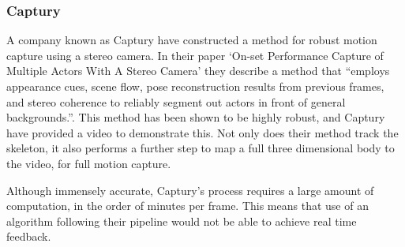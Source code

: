 \subsubsection{Captury}

A company known as Captury\cite{captury} have constructed a method for robust motion capture using a stereo camera. In their paper `On-set Performance Capture of Multiple Actors With A Stereo Camera'\cite{capturystereopaper} they describe a method that ``employs appearance cues, scene flow, pose reconstruction results from previous frames, and stereo coherence to reliably segment out actors in front of general backgrounds.''. This method has been shown to be highly robust, and Captury have provided a video\cite{capturyvideo} to demonstrate this. Not only does their method track the skeleton, it also performs a further step to map a full three dimensional body to the video, for full motion capture.

Although immensely accurate, Captury's process requires a large amount of computation, in the order of minutes per frame. This means that use of an algorithm following their pipeline would not be able to achieve real time feedback.